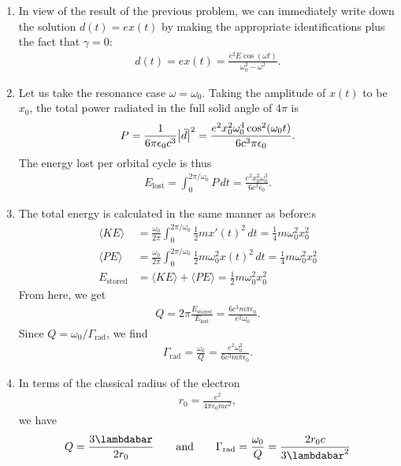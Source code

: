 \documentclass{article}
\theoremstyle{definition}
\newcommand{\f}[2]{\frac{#1}{#2}}
\begin{document}
\begin{enumerate}[label=\alph*)]
	\item In view of the result of the previous problem, we can immediately write down the solution $d(t) = ex(t)$ by making the appropriate identifications plus the fact that $\gamma=0$:
	\begin{align*}
	d(t) = ex(t) = \f{e^2 E\cos(\omega t)}{\omega_0^2 - \omega^2}.
	\end{align*}
	
	\item Let us take the resonance case $\omega = \omega_0$. Taking the amplitude of $x(t)$ to be $x_0$, the total power radiated in the full solid angle of $4\pi$ is 
	\begin{align*}
	P = \f{1}{6\pi \epsilon_0 c^3}\abs{\ddot d}^2 = \f{e^2 x_0^2 \omega_0^4 \cos^2(\omega_0 t)}{6 c^3 \pi \epsilon_0}.
	\end{align*}
	The energy lost per orbital cycle is thus
	\begin{align*}
	E_\text{lost} = \int_0^{2\pi/\omega_0} P\,dt = \f{e^2 x_0^2 \omega_0^3}{6c^3 \epsilon_0}.
	\end{align*}
	
	
	\item The total energy is calculated in the same manner as before:s
	\begin{align*}
	\langle KE\rangle &= \f{\omega_0}{2\pi} \int_0^{2\pi/\omega_0} \f{1}{2}m x'(t)^2\,dt= \f{1}{4}m \omega_0^2 x_0^2  \\
	\langle PE \rangle &= \f{\omega_0}{2\pi}\int_0^{2\pi/\omega_0} \f{1}{2}m \omega_0^2 x(t)^2\,dt  = \f{1}{4}m \omega_0^2 x_0^2 \\
	E_\text{stored} &= \langle KE \rangle + \langle PE \rangle = \f{1}{2}m \omega_0^2 x_0^2
	\end{align*}
	From here, we get
	\begin{align*}
	Q = 2\pi \f{E_\text{stored}}{E_\text{lost}} = \f{6c^3 m\pi \epsilon_0}{e^2 \omega_0}.
	\end{align*}
	Since $Q = \omega_0 / \Gamma_{\text{rad}}$, we find
	\begin{align*}
	\Gamma_\text{rad} = \f{\omega_0}{Q} = \f{e^2 \omega_0^2}{6c^3 m \pi \epsilon_0}.
	\end{align*} 
	
	\item In terms of the classical radius of the electron
	\begin{align*}
	r_0 = \f{e^2}{4\pi \epsilon_0 mc^2}, 
	\end{align*}
	we have
	\begin{align*}
	Q = \f{3\lambdabar}{2r_0} \quad\quad \text{and}\quad\quad \Gamma_\text{rad} = \f{\omega_0}{Q} = \f{2r_0c}{3\lambdabar^2}
	\end{align*}
	

\end{enumerate}
\end{document}
